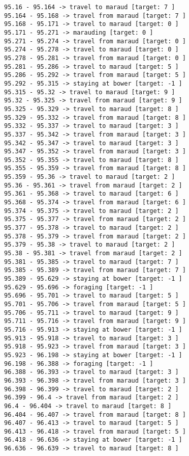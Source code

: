 \documentclass[11pt]{article}
\begin{document}
\begin{Verbatim}[commandchars=\\\{\}]
95.16 - 95.164 -> travel to maraud [target: 7 ]
95.164 - 95.168 -> travel from maraud [target: 7 ]
95.168 - 95.171 -> travel to maraud [target: 0 ]
95.171 - 95.271 -> marauding [target: 0 ]
95.271 - 95.274 -> travel from maraud [target: 0 ]
95.274 - 95.278 -> travel to maraud [target: 0 ]
95.278 - 95.281 -> travel from maraud [target: 0 ]
95.281 - 95.286 -> travel to maraud [target: 5 ]
95.286 - 95.292 -> travel from maraud [target: 5 ]
95.292 - 95.315 -> staying at bower [target: -1 ]
95.315 - 95.32 -> travel to maraud [target: 9 ]
95.32 - 95.325 -> travel from maraud [target: 9 ]
95.325 - 95.329 -> travel to maraud [target: 8 ]
95.329 - 95.332 -> travel from maraud [target: 8 ]
95.332 - 95.337 -> travel to maraud [target: 3 ]
95.337 - 95.342 -> travel from maraud [target: 3 ]
95.342 - 95.347 -> travel to maraud [target: 3 ]
95.347 - 95.352 -> travel from maraud [target: 3 ]
95.352 - 95.355 -> travel to maraud [target: 8 ]
95.355 - 95.359 -> travel from maraud [target: 8 ]
95.359 - 95.36 -> travel to maraud [target: 2 ]
95.36 - 95.361 -> travel from maraud [target: 2 ]
95.361 - 95.368 -> travel to maraud [target: 6 ]
95.368 - 95.374 -> travel from maraud [target: 6 ]
95.374 - 95.375 -> travel to maraud [target: 2 ]
95.375 - 95.377 -> travel from maraud [target: 2 ]
95.377 - 95.378 -> travel to maraud [target: 2 ]
95.378 - 95.379 -> travel from maraud [target: 2 ]
95.379 - 95.38 -> travel to maraud [target: 2 ]
95.38 - 95.381 -> travel from maraud [target: 2 ]
95.381 - 95.385 -> travel to maraud [target: 7 ]
95.385 - 95.389 -> travel from maraud [target: 7 ]
95.389 - 95.629 -> staying at bower [target: -1 ]
95.629 - 95.696 -> foraging [target: -1 ]
95.696 - 95.701 -> travel to maraud [target: 5 ]
95.701 - 95.706 -> travel from maraud [target: 5 ]
95.706 - 95.711 -> travel to maraud [target: 9 ]
95.711 - 95.716 -> travel from maraud [target: 9 ]
95.716 - 95.913 -> staying at bower [target: -1 ]
95.913 - 95.918 -> travel to maraud [target: 3 ]
95.918 - 95.923 -> travel from maraud [target: 3 ]
95.923 - 96.198 -> staying at bower [target: -1 ]
96.198 - 96.388 -> foraging [target: -1 ]
96.388 - 96.393 -> travel to maraud [target: 3 ]
96.393 - 96.398 -> travel from maraud [target: 3 ]
96.398 - 96.399 -> travel to maraud [target: 2 ]
96.399 - 96.4 -> travel from maraud [target: 2 ]
96.4 - 96.404 -> travel to maraud [target: 8 ]
96.404 - 96.407 -> travel from maraud [target: 8 ]
96.407 - 96.413 -> travel to maraud [target: 5 ]
96.413 - 96.418 -> travel from maraud [target: 5 ]
96.418 - 96.636 -> staying at bower [target: -1 ]
96.636 - 96.639 -> travel to maraud [target: 8 ]

\end{Verbatim}
\end{document}
